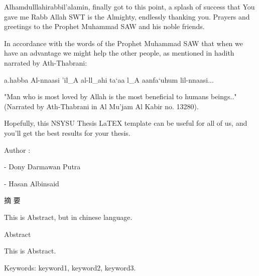 \documentclass[12pt, twoside , openright]{book}
\begin{document}
Alhamdulllahirabbil’alamin, finally got to this point, a splash of success that You gave me Rabb Allah SWT is the Almighty, endlessly thanking you. Prayers and greetings to the Prophet Muhammad SAW and his noble friends.  

In accordance with the words of the Prophet Muhammad SAW that when we have an advantage we might help the other people, as mentioned in hadith narrated by Ath-Thabrani:

\begin{center}
	\begin{RLtext}
		a.habba Al-nnaasi 'il_A al-ll_ahi ta`aa l_A aanfa`uhum lil-nnaasi...
	\end{RLtext}
\end{center}

"Man who is most loved by Allah is the most beneficial to humans  beings.." (Narrated by Ath-Thabrani in Al Mu’jam Al Kabir no. 13280).

Hopefully, this NSYSU Thesis LaTEX template can be useful for all of us, and you'll get the best results for your thesis.

\noindent
Author :

\vspace{-2em}
- Dony Darmawan Putra

\vspace{-2em}
- Hasan Albinsaid

\newpage
\mbox{}
\newpage





\begin{center}
	{\chinnesesize 摘 要}
\end{center}
This is Abstract, but in chinese language. \blindtext[1]
\newpage
\mbox{}
\newpage





\begin{center}
	{\chinnesesize Abstract}
\end{center}

This is Abstract. \blindtext[1]

\noindent Keywords: keyword1, keyword2, keyword3.
\newpage




\tableofcontents
\newpage




\listoffigures
\newpage
\end{document}
